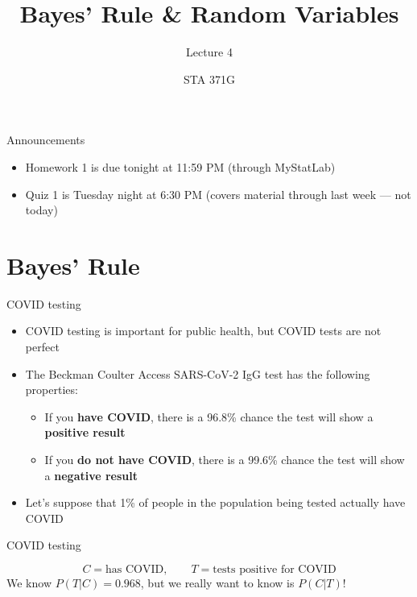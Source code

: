 \documentclass{beamer}\usepackage[]{graphicx}\usepackage[]{color}
\title{Bayes' Rule \& Random Variables}
\subtitle{Lecture 4}
\author{STA 371G}
\begin{document}
\frame{\maketitle}


\begin{darkframes}

\begin{frame}{Announcements}
  \begin{itemize}
    \item Homework 1 is due tonight at 11:59 PM (through MyStatLab)
    \item Quiz 1 is Tuesday night at 6:30 PM (covers material through last week --- not today)
  \end{itemize}
\end{frame}

\section{Bayes' Rule}

\begin{frame}{COVID testing}
  \begin{itemize}[<+->]
    \item COVID testing is important for public health, but COVID tests are not perfect
    \item The Beckman Coulter Access SARS-CoV-2 IgG test has the following properties:
      \begin{itemize}
        \item If you \textbf{have COVID}, there is a 96.8\% chance the test will show a \textbf{positive result}
        \item If you \textbf{do not have COVID}, there is a 99.6\% chance the test will show a \textbf{negative result}
      \end{itemize}
    \item Let's suppose that 1\% of people in the population being tested actually have COVID
  \end{itemize}
\end{frame}

\begin{frame}{COVID testing}
  \begin{center}
    \[
      C = \text{has COVID}, \qquad T = \text{tests positive for COVID}
    \]
    We know $P(T|C) = 0.968$, but we really want to know is $P(C|T)$!
  \end{center}
\end{frame}


\end{darkframes}
\end{document}
